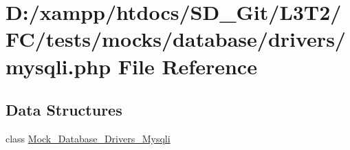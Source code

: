 \hypertarget{drivers_2mysqli_8php}{}\section{D\+:/xampp/htdocs/\+S\+D\+\_\+\+Git/\+L3\+T2/\+F\+C/tests/mocks/database/drivers/mysqli.php File Reference}
\label{drivers_2mysqli_8php}
\subsection*{Data Structures}
\begin{DoxyCompactItemize}
\item 
class \hyperlink{class_mock___database___drivers___mysqli}{Mock\+\_\+\+Database\+\_\+\+Drivers\+\_\+\+Mysqli}
\end{DoxyCompactItemize}

